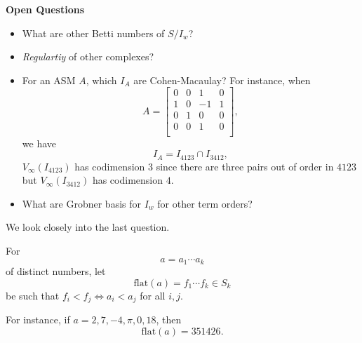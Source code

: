 \documentclass[co439]{subfiles}
\begin{document}
    \begin{boxy}{\itckabelstd\textbf{Open Questions}}
        \vspace{-11pt}
        \begin{itemize}
            \item What are other Betti numbers of $S /I_w$?
            \item \textit{Regulartiy} of other complexes?
            \item For an ASM $A$, which $I_A$ are Cohen-Macaulay? For instance, when
                \begin{equation*}
                    A =
                    \begin{bmatrix}
                    	0 & 0 & 1 & 0 \\
                    	1 & 0 & -1 & 1 \\
                    	0 & 1 & 0 & 0 \\
                    	0 & 0 & 1 & 0 \\
                    \end{bmatrix},
                \end{equation*}
                we have
                \begin{equation*}
                    I_A = I_{4123} \cap I_{3412},
                \end{equation*}
                $V_{\infty}\left( I_{4123} \right)$ has codimension $3$ since there are three pairs out of order in $4123$ but $V_{\infty}\left( I_{3412} \right)$ has codimension $4$.
            \item What are Grobner basis for $I_w$ for other term orders? 
        \end{itemize} 
    \end{boxy}

    \np We look closely into the last question.

    For
    \begin{equation*}
        a = a_1\cdots a_k
    \end{equation*}
    of distinct numbers, let
    \begin{equation*}
        \text{flat}\left( a \right) = f_1\cdots f_k\in S_k
    \end{equation*}
    be such that $f_i<f_j \iff a_i<a_j$ for all $i,j$.

    For instance, if $a=2,7,-4,\pi,0,18$, then
    \begin{equation*}
        \text{flat}\left( a \right) = 351426.
    \end{equation*}
\end{document}
